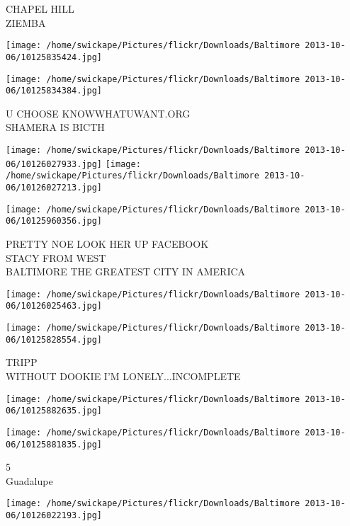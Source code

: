 \documentclass[10pt,letterpaper]{article}
\begin{document}
CHAPEL HILL\\
ZIEMBA\\
\pagebreak

\texttt{[image: /home/swickape/Pictures/flickr/Downloads/Baltimore 2013-10-06/10125835424.jpg]}

\vspace{0.25in}
\texttt{[image: /home/swickape/Pictures/flickr/Downloads/Baltimore 2013-10-06/10125834384.jpg]}

U CHOOSE KNOWWHATUWANT.ORG\\
SHAMERA IS BICTH\\
\pagebreak

\texttt{[image: /home/swickape/Pictures/flickr/Downloads/Baltimore 2013-10-06/10126027933.jpg]}
\texttt{[image: /home/swickape/Pictures/flickr/Downloads/Baltimore 2013-10-06/10126027213.jpg]}

\vspace{0.25in}
\texttt{[image: /home/swickape/Pictures/flickr/Downloads/Baltimore 2013-10-06/10125960356.jpg]}

PRETTY NOE LOOK HER UP FACEBOOK\\
STACY FROM WEST\\
BALTIMORE THE GREATEST CITY IN AMERICA\\
\pagebreak

\texttt{[image: /home/swickape/Pictures/flickr/Downloads/Baltimore 2013-10-06/10126025463.jpg]}

\vspace{0.25in}
\texttt{[image: /home/swickape/Pictures/flickr/Downloads/Baltimore 2013-10-06/10125828554.jpg]}

TRIPP\\
WITHOUT DOOKIE I'M LONELY...INCOMPLETE\\
\pagebreak

\texttt{[image: /home/swickape/Pictures/flickr/Downloads/Baltimore 2013-10-06/10125882635.jpg]}

\vspace{0.25in}
\texttt{[image: /home/swickape/Pictures/flickr/Downloads/Baltimore 2013-10-06/10125881835.jpg]}

5\\
Guadalupe\\
\pagebreak

\texttt{[image: /home/swickape/Pictures/flickr/Downloads/Baltimore 2013-10-06/10126022193.jpg]}
\end{document}
